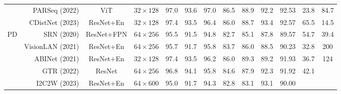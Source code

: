 \documentclass[10pt,journal,compsoc]{IEEEtran}
\begin{document}
\begin{table*}[t]
{\begin{tabular}{c|r|c|c|ccc|ccc|c|cc}
                        & PARSeq  \cite{BautistaA22PARSeq} (2022)  & ViT        & $32\times128$        & 97.0          & 93.6          & 97.0 & 86.5          & 88.9          & 92.2          & 92.53                                                                       & 23.8                                                                    & 84.7     \\
                        & CDistNet  \cite{zheng2023cdistnet} (2023)  & ResNet+En        & $32\times128$        & 97.4          & 93.5          & 96.4 & 86.0          & 88.7          & 93.4          & 92.57                                                                       & 65.5                                                                    & 14.5     \\
\hline
\multirow{6}{*}{PD}     & SRN \cite{yu2020srn} (2020)  & ResNet+FPN     & $64\times256$           & 95.5          & 91.5          & 94.8          & 82.7          & 85.1          & 87.8          & 89.57                                                                       & 54.7                                                                    & 39.4                                                                 \\
                        & VisionLAN \cite{Wang_2021_visionlan} (2021)& ResNet+En       & $64\times256$      & 95.7          & 91.7          & 95.8          & 83.7          & 86.0          & 88.5          & 90.23                                                                       & 32.8                                                                    & 200                                                                    \\
                        & ABINet \cite{TPAMI2022ABINetPP} (2021) & ResNet+En     & $32\times128$          & 97.4          & 93.5          & 96.2          & 86.0          & 89.3          & 89.2          & 91.93                                                                       & 36.7                                                                    & 124                                                               \\
                        & GTR \cite{HeC0LHWD22GTR} (2022) & ResNet       & $64\times256$           & 96.8          & 94.1          & 95.8          & 84.6          & 87.9          & 92.3          & 91.92                                                                       & 42.1                                                                    &    \\
                        & I2C2W \cite{tpami2023I2C2W} (2023) & ResNet+En       & $64\times600$           & 95.0          & 91.7          & 94.3          & 82.8          & 83.1          & 93.1          & 90.00                                                                       &                                                                     & \\

\end{tabular}}
\end{table*}
\end{document}
